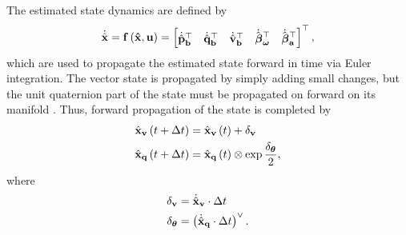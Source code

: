 \documentclass[english]{article}
\begin{document}
The estimated state dynamics are defined by
\begin{equation}
\dot{\hat{\bf x}} = f\left( \hat{\bf x}, {\bf u} \right) = \begin{bmatrix} \dot{\hat{\bf p}}_b^\top & \dot{\hat{\bf q}}_b^\top & \dot{\hat{\bf v}}_b^\top & \dot{\hat{\boldsymbol \beta}}_{\boldsymbol \omega}^\top & \dot{\hat{\boldsymbol \beta}}_{\bf a}^\top \end{bmatrix}^\top,
\end{equation}
which are used to propagate the estimated state forward in time via Euler integration. The vector state is propagated by simply adding small changes, but the unit quaternion part of the state must be propagated on forward on its manifold \cite{key-1}. Thus, forward propagation of the state is completed by
\begin{align}
\hat{{\bf x}}_{\bf v}\left(t+\Delta t\right) & = \hat{\bf x}_{\bf v}\left(t\right) + \delta_{\bf v} \\
\hat{{\bf x}}_{\bf q}\left(t+\Delta t\right) & = \hat{{\bf x}}_{\bf q}\left(t\right) \otimes \exp \frac{\delta_{\boldsymbol \theta}}{2},
\end{align}
where
\begin{align}
\delta_{\bf v} & = \dot{\hat{{\bf x}}}_{\bf v} \cdot \Delta t \\
\delta_{\boldsymbol \theta} & = \left(\dot{\hat{{\bf x}}}_{\bf q} \cdot \Delta t \right)^\lor.
\end{align}
\end{document}
